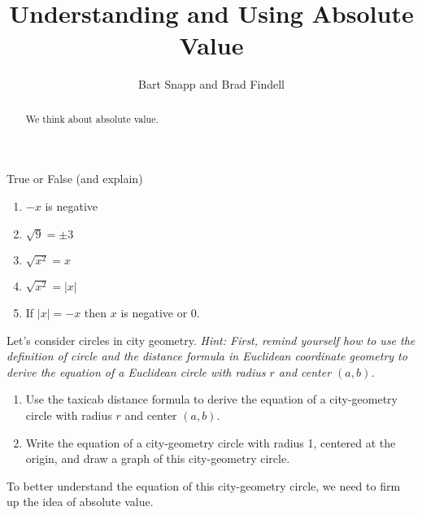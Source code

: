 \documentclass[nooutcomes]{ximera}
\title{Understanding and Using Absolute Value}
\author{Bart Snapp and Brad Findell}
\begin{document}
\begin{abstract}
We think about absolute value.
\end{abstract}
\maketitle

\begin{problem}
True or False (and explain)
\begin{enumerate}
\item $-x$ is negative
\item $\sqrt{9} = \pm 3$
\item $\sqrt{x^2} = x$
\item $\sqrt{x^2} = |x|$
\item If $|x| = -x$ then $x$ is negative or 0. 
\end{enumerate}
\vfill
\end{problem}

\begin{problem}
Let's consider circles in city geometry.  \emph{Hint: First, remind yourself how to use the definition of circle and the distance formula in Euclidean coordinate geometry to derive the equation of a Euclidean circle with radius $r$ and center $(a, b)$.}  
\begin{enumerate}
\item Use the taxicab distance formula to derive the equation of a city-geometry circle with radius $r$ and center $(a, b)$.  
\item Write the equation of a city-geometry circle with radius 1, centered at the origin, and draw a graph of this city-geometry circle.  
\end{enumerate}
\vfill
\end{problem}

\newpage

To better understand the equation of this city-geometry circle, we need to firm up the idea of absolute value.  
\end{document}
